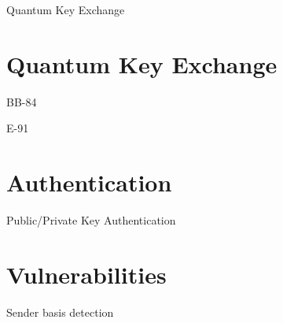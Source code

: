 \documentclass{beamer}
\begin{document}
	\begin{frame}{Quantum Key Exchange} %

	\end{frame}

	\section{Quantum Key Exchange}

	\begin{frame}{BB-84} %

	\end{frame}

	\begin{frame}{E-91} %

	\end{frame}

	\section{Authentication}

	\begin{frame}{Public/Private Key Authentication} %

	\end{frame}

	\section{Vulnerabilities}

	\begin{frame}{Sender basis detection} %

	\end{frame}


	\begin{frame}[plain]\end{frame}
\end{document}
